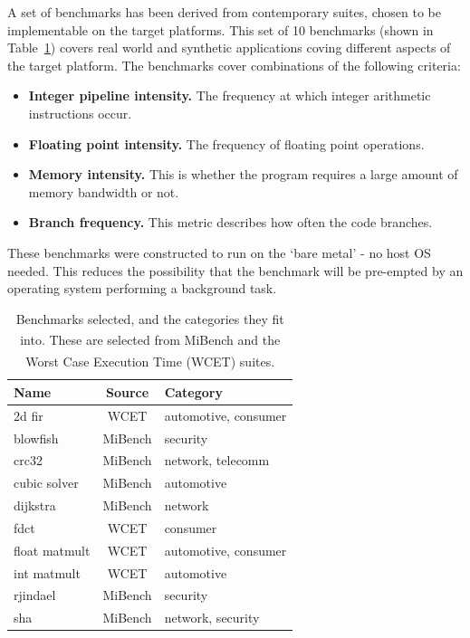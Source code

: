 \documentclass[twocolumn]{article}
\let\oldcite\cite
\renewcommand{\cite}[1]{\textsuperscript{\oldcite{#1}}}
\begin{document}
A set of benchmarks has been derived from contemporary suites, chosen to be implementable on the target platforms. This set of 10 benchmarks (shown in Table~\ref{Table:Benchmarks}) covers real world and synthetic applications coving different aspects of the target platform. The benchmarks cover combinations of the following criteria:
\begin{itemize}
	\setlength{\itemsep}{0em}
	\vspace{-1mm}
	\item \textbf{Integer pipeline intensity.} The frequency at which integer arithmetic instructions occur.
	\item \textbf{Floating point intensity.} The frequency of floating point operations.
	\item \textbf{Memory intensity.} This is whether the program requires a large amount of memory bandwidth or not.
	\item \textbf{Branch frequency.} This metric describes how often the code branches.
\end{itemize}

These benchmarks were constructed to run on the `bare metal' - no host OS needed. This reduces the possibility that the benchmark will be pre-empted by an operating system performing a background task.

\begin{table}
	\centering
	\begin{tabular}{l c l}
	\textbf{Name}			& \textbf{Source} 	& \textbf{Category} \\
	\hline
	2d fir					& WCET 		& automotive, consumer	\\
	blowfish				& MiBench 	& security	\\
	crc32					& MiBench 	& network, telecomm	\\
	cubic solver			& MiBench 	& automotive	\\
	dijkstra				& MiBench 	& network	\\
	fdct					& WCET 		& consumer	\\
	float matmult			& WCET 		& automotive, consumer	\\
	int matmult				& WCET	 	& automotive	\\
	rjindael				& MiBench 	& security	\\
	sha						& MiBench 	& network, security	\\
	\end{tabular}
\caption{Benchmarks selected, and the categories they fit into. These are selected from MiBench\cite{MiBench} and the Worst Case Execution Time (WCET)\cite{WCET} suites.}
\label{Table:Benchmarks}
\end{table}
\end{document}
